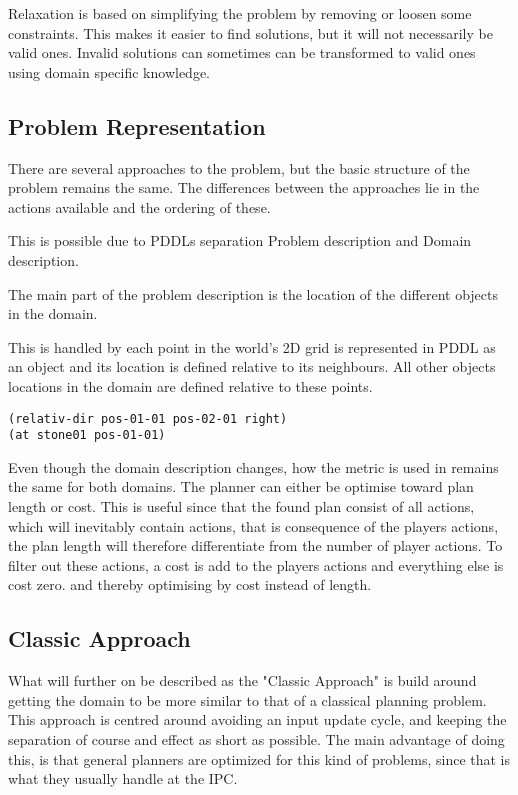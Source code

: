 	Relaxation is based on simplifying the problem by removing or loosen some constraints. This makes it easier to find solutions, but it will not necessarily be valid ones. Invalid solutions can sometimes can be transformed to valid ones using domain specific knowledge.
	
	\subsection{Problem Representation}
		There are several approaches to the problem, but the basic structure of the problem remains the same. The differences between the approaches lie in the actions available and the ordering of these. 

		This is possible due to PDDLs separation Problem description and Domain description.
		
		The main part of the problem description is the location of the different objects in the domain. 

		This is handled by each point in the world's 2D grid is represented in PDDL as an object and its location is defined relative to its neighbours. All other objects locations in the domain are defined relative to these points.
		\begin{lstlisting}
(relativ-dir pos-01-01 pos-02-01 right)
(at stone01 pos-01-01)
		\end{lstlisting}
		

		
		Even though the domain description changes, how the metric is used in remains the same for both domains. The planner can either be optimise toward plan length or cost. This is useful since that the found plan consist of all actions, which will inevitably contain actions, that is consequence of the players actions, the plan length will therefore differentiate from the number of player actions. To filter out these actions, a cost is add to the players actions and everything else is cost zero. and thereby optimising by cost instead of length.
	
		
		\subsection{Classic Approach}
		What will further on be described as the "Classic Approach" is build around getting the domain to be more similar to that of a classical planning problem. 
		This approach is centred around avoiding an input update cycle, and keeping the separation of course and effect as short as possible. The main advantage of doing this, is that general planners are optimized for this kind of problems, since that is what they usually handle at the IPC.
		
